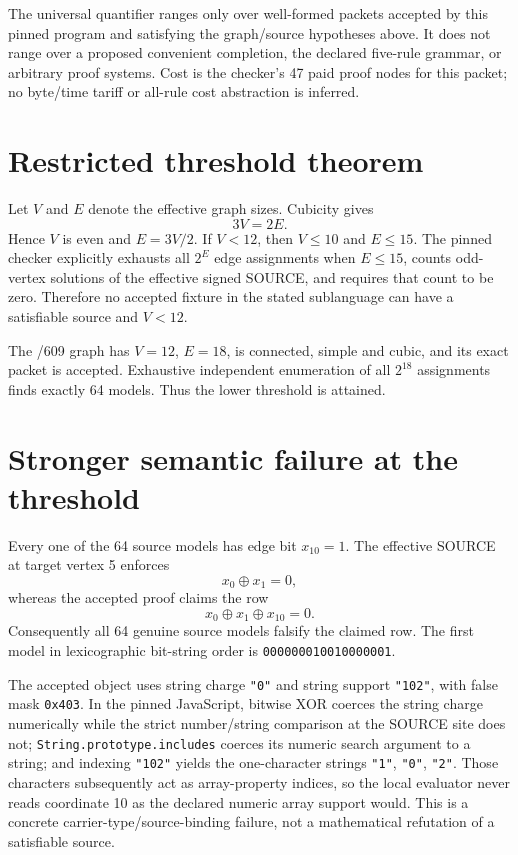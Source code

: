 \documentclass[11pt]{article}
\begin{document}
The universal quantifier ranges only over well-formed packets accepted by this pinned program and satisfying the graph/source hypotheses above.  It does not range over a proposed convenient completion, the declared five-rule grammar, or arbitrary proof systems.  Cost is the checker's 47 paid proof nodes for this packet; no byte/time tariff or all-rule cost abstraction is inferred.

\section*{Restricted threshold theorem}
Let \(V\) and \(E\) denote the effective graph sizes.  Cubicity gives
\[
  3V=2E.
\]
Hence \(V\) is even and \(E=3V/2\).  If \(V<12\), then \(V\leq 10\) and \(E\leq 15\).  The pinned checker explicitly exhausts all \(2^E\) edge assignments when \(E\leq15\), counts odd-vertex solutions of the effective signed SOURCE, and requires that count to be zero.  Therefore no accepted fixture in the stated sublanguage can have a satisfiable source and \(V<12\).

The /609 graph has \(V=12\), \(E=18\), is connected, simple and cubic, and its exact packet is accepted.  Exhaustive independent enumeration of all \(2^{18}\) assignments finds exactly 64 models.  Thus the lower threshold is attained.

\section*{Stronger semantic failure at the threshold}
Every one of the 64 source models has edge bit \(x_{10}=1\).  The effective SOURCE at target vertex 5 enforces
\[
  x_0\oplus x_1=0,
\]
whereas the accepted proof claims the row
\[
  x_0\oplus x_1\oplus x_{10}=0.
\]
Consequently all 64 genuine source models falsify the claimed row.  The first model in lexicographic bit-string order is
\texttt{000000010010000001}.

The accepted object uses string charge \texttt{"0"} and string support \texttt{"102"}, with false mask \texttt{0x403}.  In the pinned JavaScript, bitwise XOR coerces the string charge numerically while the strict number/string comparison at the SOURCE site does not; \texttt{String.prototype.includes} coerces its numeric search argument to a string; and indexing \texttt{"102"} yields the one-character strings \texttt{"1"}, \texttt{"0"}, \texttt{"2"}.  Those characters subsequently act as array-property indices, so the local evaluator never reads coordinate 10 as the declared numeric array support would.  This is a concrete carrier-type/source-binding failure, not a mathematical refutation of a satisfiable source.
\end{document}
